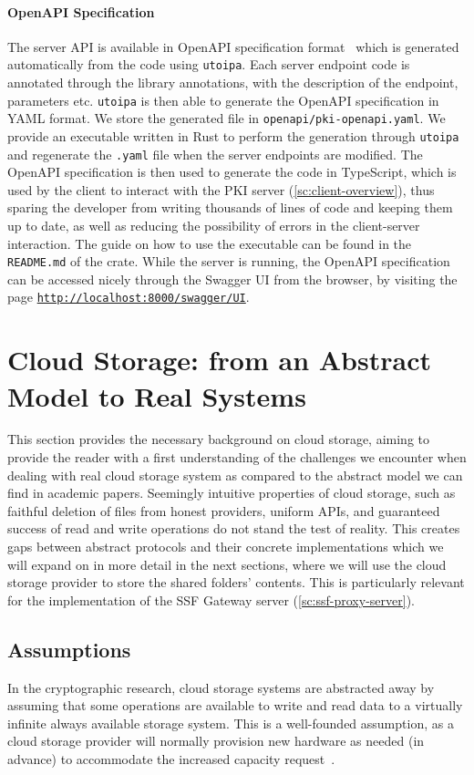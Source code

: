 \paragraph{OpenAPI Specification}
The server API is available in OpenAPI
specification format~\cite{OpenAPISurvey} 
which is generated automatically from the code using
\texttt{utoipa}. Each server endpoint code is
annotated through the library annotations, with the description
of the endpoint, parameters etc. \texttt{utoipa} is then
able to generate the OpenAPI specification in YAML format.
We store the generated file in \texttt{openapi/pki-openapi.yaml}.
We provide an executable written in Rust to perform the generation
through \texttt{utoipa} and regenerate the \texttt{.yaml}
file when the server endpoints are modified.
The OpenAPI specification is then used to generate the
code in TypeScript, which is used by the client to interact
with the PKI server (\cref{sc:client-overview}), thus sparing
the developer from writing thousands of lines of code and keeping them up to date, 
as well as reducing the possibility of errors in the client-server interaction. 
The guide on how to use the executable can be found in the \texttt{README.md}
of the crate.
While the server is running, the OpenAPI specification can be
accessed nicely through the Swagger UI from the browser, 
by visiting the page \texttt{\url{http://localhost:8000/swagger/UI}}.

\section{Cloud Storage: from an Abstract Model to Real Systems}\label{sc:cloud-storage}

This section provides the necessary background on cloud storage,
aiming to provide the reader with a first understanding of the challenges
we encounter when dealing with real cloud storage system
as compared to the abstract model we can find in academic papers.
Seemingly intuitive properties of cloud storage, such as faithful deletion of files from honest
providers, uniform APIs, and guaranteed success of read and write operations do not stand the test
of reality.
This creates gaps between abstract protocols and their concrete implementations
which we will expand on in more detail in the next sections,
where we will use the cloud storage provider to store the shared folders' contents.
This is particularly relevant for the implementation of the
SSF Gateway server (\cref{sc:ssf-proxy-server}).

\subsection{Assumptions}\label{scc:cloud-storage-assumptions}
In the cryptographic research, cloud storage systems are abstracted away by assuming
that some operations are available to write and read data to a virtually
infinite always available storage system.
This is a well-founded assumption, as a cloud storage provider
will normally provision new hardware as needed (in advance) to accommodate the
increased capacity request~\cite{AzureBlobStorage}.


